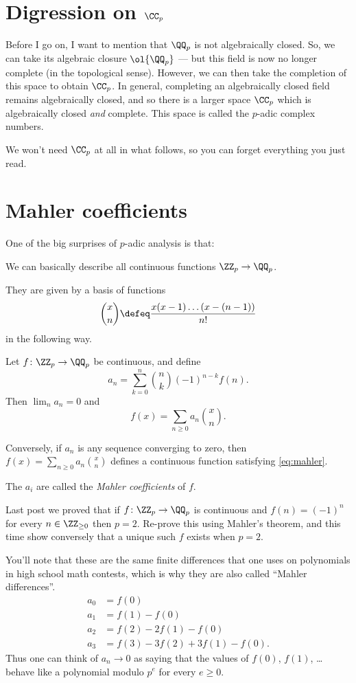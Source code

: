 \section{Digression on $\CC_p$}
Before I go on, I want to mention that $\QQ_p$
is not algebraically closed.
So, we can take its algebraic closure $\ol{\QQ_p}$ --- but this
field is now no longer complete (in the topological sense).
However, we can then take the completion of this space
to obtain $\CC_p$.
In general, completing an algebraically closed field
remains algebraically closed,
and so there is a larger space $\CC_p$ which
is algebraically closed \emph{and} complete.
This space is called the $p$-adic complex numbers.

We won't need $\CC_p$ at all in what follows,
so you can forget everything you just read.

\section{Mahler coefficients}
One of the big surprises of $p$-adic analysis is that:
\begin{moral}
	We can basically describe all continuous functions $\ZZ_p \to \QQ_p$.
\end{moral}
They are given by a basis of functions
\[ \binom xn \defeq \frac{x(x-1) \dots (x-(n-1))}{n!} \]
in the following way.
\begin{theorem}
	Let $f \colon \ZZ_p \to \QQ_p$ be continuous, and define
	\begin{equation}
		a_n = \sum_{k=0}^n \binom nk (-1)^{n-k} f(n).
		\label{eq:mahler}
	\end{equation}
	Then $\lim_n a_n = 0$ and \[ f(x) = \sum_{n \ge 0} a_n \binom xn. \]

	Conversely, if $a_n$ is any sequence converging to zero,
	then $f(x) = \sum_{n \ge 0} a_n \binom xn$
	defines a continuous function satisfying \eqref{eq:mahler}.
\end{theorem}
The $a_i$ are called the \emph{Mahler coefficients} of $f$.
\begin{exercise}
	Last post we proved that if $f \colon \ZZ_p \to \QQ_p$ is continuous
	and $f(n) = (-1)^n$ for every $n \in \ZZ_{\ge 0}$ then $p = 2$.
	Re-prove this using Mahler's theorem,
	and this time show conversely that a unique such $f$ exists when $p=2$.
\end{exercise}

You'll note that these are the same finite differences that one
uses on polynomials in high school math contests,
which is why they are also called ``Mahler differences''.
\begin{align*}
	a_0 &= f(0) \\
	a_1 &= f(1) - f(0) \\
	a_2 &= f(2) - 2f(1) - f(0) \\
	a_3 &= f(3) - 3f(2) + 3f(1) - f(0).
\end{align*}
Thus one can think of $a_n \to 0$ as saying that
the values of $f(0)$, $f(1)$, \dots behave like a polynomial modulo $p^e$
for every $e \ge 0$.


